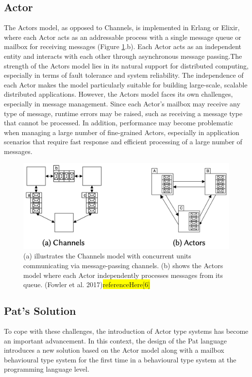 \documentclass{l4proj}
\begin{document}
\subsection{Actor}
The Actors model, as opposed to Channels, is implemented in Erlang or Elixir, where each Actor acts as an addressable process with a single message queue or mailbox for receiving messages (Figure \ref{fig:channel_actor}.b). Each Actor acts as an independent entity and interacts with each other through asynchronous message passing.The strength of the Actors model lies in its natural support for distributed computing, especially in terms of fault tolerance and system reliability. The independence of each Actor makes the model particularly suitable for building large-scale, scalable distributed applications. However, the Actors model faces its own challenges, especially in message management. Since each Actor's mailbox may receive any type of message, runtime errors may be raised, such as receiving a message type that cannot be processed. In addition, performance may become problematic when managing a large number of fine-grained Actors, especially in application scenarios that require fast response and efficient processing of a large number of messages.

\begin{figure}
    \centering
    \includegraphics[width=0.7\linewidth]{images/channel_actor.png}    
    \caption{ (a) illustrates the Channels model with concurrent units communicating via message-passing channels. (b) shows the Actors model where each Actor independently processes messages from its queue. (Fowler et al. 2017)\colorbox{yellow}{referenceHere[6]}
    }
    \label{fig:channel_actor} 
\end{figure}

\subsection{Pat's Solution}
To cope with these challenges, the introduction of Actor type systems has become an important advancement. In this context, the design of the Pat language introduces a new solution based on the Actor model along with a mailbox behavioural type system for the first time in a behavioural type system at the programming language level.
\end{document}
